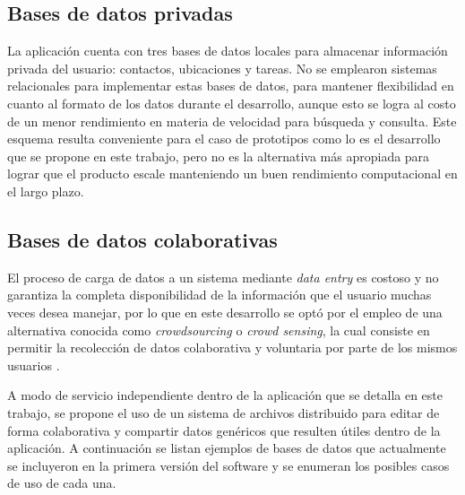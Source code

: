 \subsection{Bases de datos privadas} \label{sec:db_priv}
La aplicación cuenta con tres bases de datos locales para almacenar información privada del usuario: contactos, ubicaciones y tareas. No se emplearon sistemas relacionales para implementar estas bases de datos, para mantener flexibilidad en cuanto al formato de los datos durante el desarrollo, aunque esto se logra al costo de un menor rendimiento en materia de velocidad para búsqueda y consulta. Este esquema resulta conveniente para el caso de prototipos como lo es el desarrollo que se propone en este trabajo, pero no es la alternativa más apropiada para lograr que el producto escale manteniendo un buen rendimiento computacional en el largo plazo.

\subsection{Bases de datos colaborativas} \label{sec:ipfs}
El proceso de carga de datos a un sistema mediante \textit{data entry} es costoso y no garantiza la completa disponibilidad de la información que el usuario muchas veces desea manejar, por lo que en este desarrollo se optó por el empleo de una alternativa conocida como \textit{crowdsourcing} o \textit{crowd sensing}, la cual consiste en permitir la recolección de datos colaborativa y voluntaria por parte de los mismos usuarios \cite{boubiche2019}.

A modo de servicio independiente dentro de la aplicación que se detalla en este trabajo, se propone el uso de un sistema de archivos distribuido para editar de forma colaborativa y compartir datos genéricos que resulten útiles dentro de la aplicación. A continuación se listan ejemplos de bases de datos que actualmente se incluyeron en la primera versión del software y se enumeran los posibles casos de uso de cada una.


